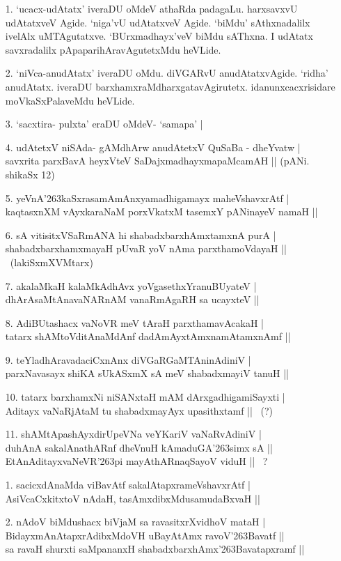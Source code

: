 \begin{itemize}
 \item[1.] `ucacx-udAtatx' iveraDU oMdeV athaRda padagaLu. harxsavxvU udAtatxveV Agide. `niga'vU udAtatxveV Agide. `biMdu' sAthxnadalilx ivelAlx uMTAgutatxve. `BUrxmadhayx'veV biMdu sAThxna. I udAtatx savxradalilx pApaparihAravAgutetxMdu heVLide.
 \item[2.] `niVca-anudAtatx' iveraDU oMdu. diVGARvU anudAtatxvAgide. `ridha' anudAtatx. iveraDU barxhamxraMdharxgatavAgirutetx. idanunxcacxrisidare moVkaSxPalaveMdu heVLide.
 \item[3.] `sacxtira- pulxta' eraDU oMdeV- `samapa' |
 \item[4.] udAtetxV niSAda- gAMdhArw anudAtetxV QuSaBa - dheYvatw |\\
 savxrita parxBavA heyxVteV SaDajxmadhayxmapaMcamAH ||
 \hfill{(pANi. shikaSx 12)}
 \item[5.] yeVnA\char'263kaSxrasamAmAnxyamadhigamayx maheVshavxrAtf |\\
 kaqtasxnXM vAyxkaraNaM porxVkatxM tasemxY pANinayeV namaH ||
 \item[6.] sA vitisitxVSaRmANA hi shabadxbarxhAmxtamxnA purA |\\
 shabadxbarxhamxmayaH pUvaR yoV nAma parxthamoVdayaH || ~(lakiSxmXVMtarx)
 \item[7.] akalaMkaH kalaMkAdhAvx yoVgasethxYranuBUyateV |\\
 dhArAsaMtAnavaNARnAM vanaRmAgaRH sa ucayxteV ||
 \item[8.] AdiBUtashacx vaNoVR meV tAraH parxthamavAcakaH |\\
 tatarx shAMtoVditAnaMdAnf dadAmAyxtAmxnamAtamxnAmf ||
 \item[9.] teYladhAravadaciCxnAnx diVGaRGaMTAninAdiniV |\\
 parxNavasayx shiKA sUkASxmX sA meV shabadxmayiV tanuH ||
 \item[10.] tatarx barxhamxNi niSANxtaH mAM dArxgadhigamiSayxti |\\
 Aditayx vaNaRjAtaM tu shabadxmayAyx upasithxtamf || ~(?)
 \item[11.] shAMtApashAyxdirUpeVNa veYKariV vaNaRvAdiniV |\\
 duhAnA sakalAnathARnf dheVnuH kAmaduGA\char'263simx sA ||\\
 EtAnAditayxvaNeVR\char'263pi mayAthARnaqSayoV viduH || ~?
\end{itemize}

\begin{itemize}
\item[1.] sacicxdAnaMda viBavAtf sakalAtapxrameVshavxrAtf |\\
AsiVcaCxkitxtoV nAdaH, tasAmxdibxMdusamudaBxvaH ||
\item[2.] nAdoV biMdushacx biVjaM sa ravasitxrXvidhoV mataH |\\
BidayxmAnAtapxrAdibxMdoVH uBayAtAmx ravoV\char'263Bavatf ||\\
sa ravaH shurxti saMpananxH shabadxbarxhAmx\char'263Bavatapxramf ||
\end{itemize}

